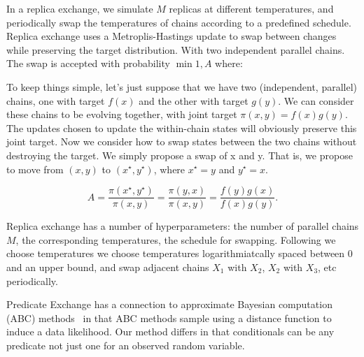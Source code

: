 In a replica exchange, we simulate $M$ replicas at different temperatures, and periodically swap the temperatures of chains according to a predefined schedule.
Replica exchange uses a Metroplis-Hastings update to swap between changes while preserving the target distribution.
With two independent parallel chains.
The swap is accepted with probability $\min{1, A}$ where:

To keep things simple, let’s just suppose that we have two (independent, parallel) chains, one with target $f(x)$ and the other with target $g(y)$. We can consider these chains to be evolving together, with joint target $\pi(x,y)=f(x)g(y)$. The updates chosen to update the within-chain states will obviously preserve this joint target. Now we consider how to swap states between the two chains without destroying the target. We simply propose a swap of x and y. That is, we propose to move from $(x,y)$ to $(x^\star,y^\star)$, where $x^\star=y$ and $y^\star=x$.

$$
A = \frac{\pi(x^\star,y^\star)}{\pi(x,y)} = \frac{\pi(y,x)}{\pi(x,y)} = \frac{f(y)g(x)}{f(x)g(y)}.
$$


Replica exchange has a number of hyperparameters: the number of parallel chains $M$, the corresponding temperatures, the schedule for swapping.
Following \cite{} we choose temperatures we choose temperatures logarithmiatcally spaced between $0$ and an upper bound, and swap adjacent chains $X_1$ with $X_2$, $X_2$ with $X_3$, etc periodically.



Predicate Exchange has a connection to approximate Bayesian computation (ABC) methods~\citep{beaumont2002approximate} in that ABC methods 
sample using a distance function to induce a data likelihood. Our method differs in that conditionals can be any predicate not just
one for an observed random variable.

